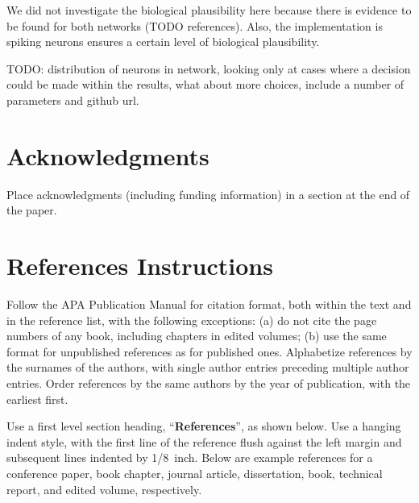 \documentclass[10pt,letterpaper]{article}
\begin{document}
We did not investigate the biological plausibility here because there is 
evidence to be found for both networks (TODO references). Also, the 
implementation is spiking neurons ensures a certain level of biological 
plausibility.

TODO\@: distribution of neurons in network, looking only at cases where 
a decision could be made within the results, what about more choices, include 
a number of parameters and github url.

\section{Acknowledgments}

Place acknowledgments (including funding information) in a section at
the end of the paper.


\section{References Instructions}

Follow the APA Publication Manual for citation format, both within the
text and in the reference list, with the following exceptions: (a) do
not cite the page numbers of any book, including chapters in edited
volumes; (b) use the same format for unpublished references as for
published ones. Alphabetize references by the surnames of the authors,
with single author entries preceding multiple author entries. Order
references by the same authors by the year of publication, with the
earliest first.

Use a first level section heading, ``{\bf References}'', as shown
below. Use a hanging indent style, with the first line of the
reference flush against the left margin and subsequent lines indented
by 1/8~inch. Below are example references for a conference paper, book
chapter, journal article, dissertation, book, technical report, and
edited volume, respectively.



\setlength{\bibleftmargin}{.125in}
\setlength{\bibindent}{-\bibleftmargin}


\end{document}
